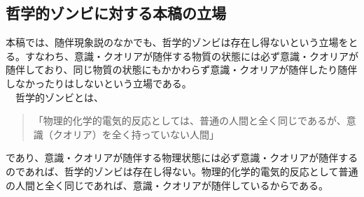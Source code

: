 \subsection{哲学的ゾンビに対する本稿の立場}
本稿では、随伴現象説のなかでも、哲学的ゾンビは存在し得ないという立場をとる。すなわち、意識・クオリアが随伴する物質の状態には必ず意識・クオリアが随伴しており、同じ物質の状態にもかかわらず意識・クオリアが随伴したり随伴しなかったりはしないという立場である。\\
　哲学的ゾンビとは、
\begin{quotation}
「物理的化学的電気的反応としては、普通の人間と全く同じであるが、意識（クオリア）を全く持っていない人間」\cite{wikipediab}
\end{quotation}
であり、意識・クオリアが随伴する物理状態には必ず意識・クオリアが随伴するのであれば、哲学的ゾンビは存在し得ない。物理的化学的電気的反応として普通の人間と全く同じであれば、意識・クオリアが随伴しているからである。